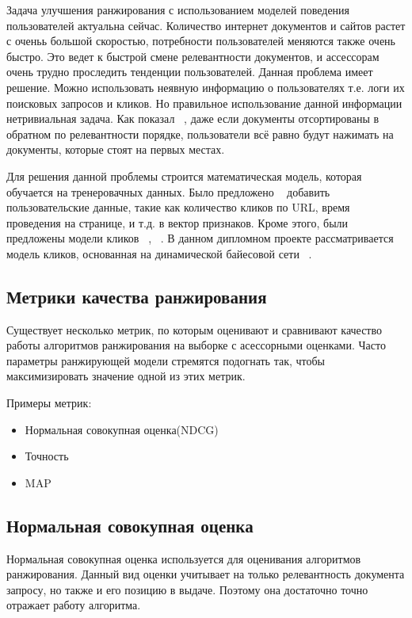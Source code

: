 Задача улучшения ранжирования с использованием моделей поведения пользователей актуальна сейчас. Количество интернет документов и сайтов растет с оченьь большой скоростью, потребности пользователей меняются также очень быстро. Это ведет к быстрой смене релевантности документов, и ассессорам очень трудно проследить тенденции пользователей. Данная проблема имеет решение. Можно использовать неявную информацию о пользователях т.е. логи их поисковых запросов и кликов. Но правильное использование данной информации нетривиальная задача. Как показал ~\cite{joachims}, даже если документы отсортированы в обратном по релевантности порядке, пользователи всё равно будут нажимать на документы, которые стоят на первых местах.

Для решения данной проблемы строится математическая модель, которая обучается на тренеровачных данных. Было предложено ~\cite{ctr_improving1} добавить пользовательские данные, такие как количество кликов по URL, время проведения на странице, и т.д. в вектор признаков. 
Кроме этого, были предложены модели кликов ~\cite{ctr_improving2}, ~\cite{ccm}. В данном дипломном проекте рассматривается модель кликов, основанная на динамической байесовой сети ~\cite{dbn}.

\subsection{ Метрики качества ранжирования}

Существует несколько метрик, по которым оценивают и сравнивают качество работы алгоритмов ранжирования на выборке с асессорными оценками. Часто параметры ранжирующей модели стремятся подогнать так, чтобы максимизировать значение одной из этих метрик.

Примеры метрик:

\begin{itemize}
  \item Нормальная совокупная оценка(NDCG)
  \item Точность
  \item MAP
\end{itemize}

\subsection{Нормальная совокупная оценка}

Нормальная совокупная оценка используется для оценивания алгоритмов ранжирования. Данный вид оценки учитывает на только релевантность документа запросу, но также и его позицию в выдаче. Поэтому она достаточно точно отражает работу алгоритма.

